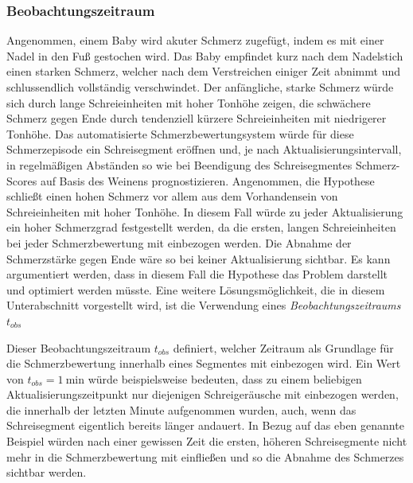   
 \subsubsection{Beobachtungszeitraum}
 
Angenommen, einem Baby wird akuter Schmerz zugefügt, indem es mit einer Nadel in den Fuß gestochen wird. Das Baby empfindet kurz nach dem Nadelstich einen starken Schmerz, welcher nach dem Verstreichen einiger Zeit abnimmt und schlussendlich vollständig verschwindet. Der anfängliche, starke Schmerz würde sich durch lange Schreieinheiten mit hoher Tonhöhe zeigen, die schwächere Schmerz gegen Ende durch tendenziell kürzere Schreieinheiten mit niedrigerer Tonhöhe.\cite{acutePainResponse} Das automatisierte Schmerzbewertungsystem würde für diese Schmerzepisode ein Schreisegment eröffnen und, je nach Aktualisierungsintervall, in regelmäßigen Abständen so wie bei Beendigung des Schreisegmentes Schmerz-Scores auf Basis des Weinens prognostizieren. Angenommen, die Hypothese schließt einen hohen Schmerz vor allem aus dem Vorhandensein von Schreieinheiten mit hoher Tonhöhe. In diesem Fall würde zu jeder Aktualisierung ein hoher Schmerzgrad festgestellt werden, da die ersten, langen Schreieinheiten bei jeder Schmerzbewertung mit einbezogen werden. Die Abnahme der Schmerzstärke gegen Ende wäre so bei keiner Aktualisierung sichtbar. Es kann argumentiert werden, dass in diesem Fall die Hypothese das Problem darstellt und optimiert werden müsste. Eine weitere Lösungsmöglichkeit, die in diesem Unterabschnitt vorgestellt wird, ist die Verwendung eines \emph{Beobachtungszeitraums} $t_{obs}$

Dieser Beobachtungszeitraum $t_{obs}$ definiert, welcher Zeitraum als Grundlage für die Schmerzbewertung innerhalb eines Segmentes mit einbezogen wird. Ein Wert von $t_{obs} = \SI{1}{\minute}$ würde beispielsweise bedeuten, dass zu einem beliebigen Aktualisierungszeitpunkt nur diejenigen Schreigeräusche mit einbezogen werden, die innerhalb der letzten Minute aufgenommen wurden, auch, wenn das Schreisegment eigentlich bereits länger andauert. In Bezug auf das eben genannte Beispiel würden nach einer gewissen Zeit die ersten, höheren Schreisegmente nicht mehr in die Schmerzbewertung mit einfließen und so die Abnahme des Schmerzes sichtbar werden.

